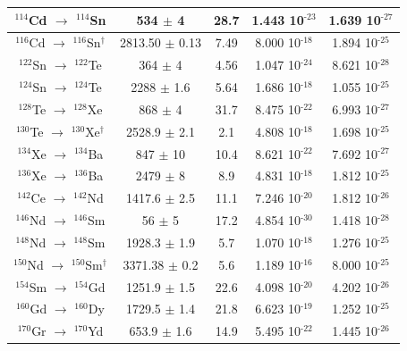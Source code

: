 \documentclass[main.tex]{subfiles}
\begin{document}
\begin{table}
\begin{tabular}{|c|c|c|c|c|}
\hline
$^{\text{114}}$Cd $\rightarrow$ $^{\text{114}}$Sn & 534    $\pm$ 4   & 28.7   & 1.443 10$^{\text{-23}}$ & 1.639 10$^{\text{-27}}$\\ 
\hline
$^{\text{116}}$Cd $\rightarrow$ $^{\text{116}}$Sn$^{\dagger}$ & 2813.50 $\pm$ 0.13   & 7.49   & 8.000 10$^{\text{-18}}$ & 1.894 10$^{\text{-25}}$\\ 
\hline
$^{\text{122}}$Sn $\rightarrow$ $^{\text{122}}$Te & 364    $\pm$ 4   & 4.56   & 1.047 10$^{\text{-24}}$ & 8.621 10$^{\text{-28}}$\\ 
\hline
$^{\text{124}}$Sn $\rightarrow$ $^{\text{124}}$Te & 2288   $\pm$ 1.6 & 5.64   & 1.686 10$^{\text{-18}}$ & 1.055 10$^{\text{-25}}$\\ 
\hline
$^{\text{128}}$Te $\rightarrow$ $^{\text{128}}$Xe & 868    $\pm$ 4   & 31.7   & 8.475 10$^{\text{-22}}$ & 6.993 10$^{\text{-27}}$\\ 
\hline
$^{\text{130}}$Te $\rightarrow$ $^{\text{130}}$Xe$^{\dagger}$ & 2528.9 $\pm$ 2.1 & 2.1   & 4.808 10$^{\text{-18}}$ & 1.698 10$^{\text{-25}}$\\ 
\hline
$^{\text{134}}$Xe $\rightarrow$ $^{\text{134}}$Ba & 847    $\pm$ 10  & 10.4   & 8.621 10$^{\text{-22}}$ & 7.692 10$^{\text{-27}}$\\ 
\hline
$^{\text{136}}$Xe $\rightarrow$ $^{\text{136}}$Ba & 2479   $\pm$ 8   & 8.9    & 4.831 10$^{\text{-18}}$ & 1.812 10$^{\text{-25}}$\\ 
\hline
$^{\text{142}}$Ce $\rightarrow$ $^{\text{142}}$Nd & 1417.6 $\pm$ 2.5 & 11.1   & 7.246 10$^{\text{-20}}$ & 1.812 10$^{\text{-26}}$\\
\hline 
$^{\text{146}}$Nd $\rightarrow$ $^{\text{146}}$Sm & 56     $\pm$ 5   & 17.2   & 4.854 10$^{\text{-30}}$ & 1.418 10$^{\text{-28}}$\\
\hline 
$^{\text{148}}$Nd $\rightarrow$ $^{\text{148}}$Sm & 1928.3 $\pm$ 1.9 & 5.7    & 1.070 10$^{\text{-18}}$ & 1.276 10$^{\text{-25}}$\\
\hline 
$^{\text{150}}$Nd $\rightarrow$ $^{\text{150}}$Sm$^{\dagger}$ & 3371.38 $\pm$ 0.2 & 5.6    & 1.189 10$^{\text{-16}}$ & 8.000 10$^{\text{-25}}$\\ 
\hline
$^{\text{154}}$Sm $\rightarrow$ $^{\text{154}}$Gd & 1251.9 $\pm$ 1.5 & 22.6   & 4.098 10$^{\text{-20}}$ & 4.202 10$^{\text{-26}}$\\ 
\hline
$^{\text{160}}$Gd $\rightarrow$ $^{\text{160}}$Dy & 1729.5 $\pm$ 1.4 & 21.8   & 6.623 10$^{\text{-19}}$ & 1.252 10$^{\text{-25}}$\\ 
\hline
$^{\text{170}}$Gr $\rightarrow$ $^{\text{170}}$Yd & 653.9  $\pm$ 1.6 & 14.9   & 5.495 10$^{\text{-22}}$ & 1.445 10$^{\text{-26}}$\\ 

\end{tabular}
\end{table}
\end{document}
